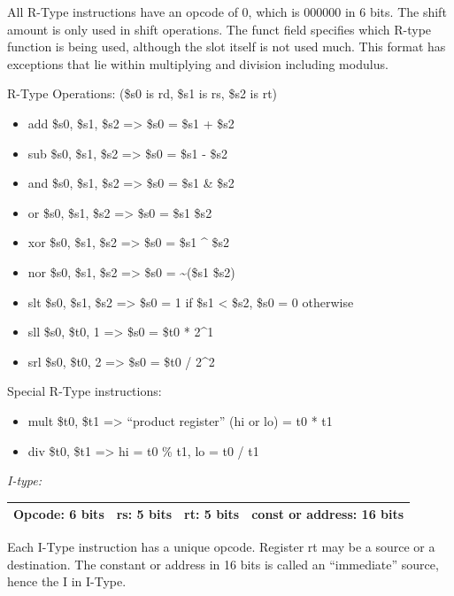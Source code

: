 \documentclass[parskip=half, fontsize=12pt]{scrartcl}
\providecommand{\tightlist}{%
  \setlength{\itemsep}{0pt}\setlength{\parskip}{0pt}}
\begin{document}
All R-Type instructions have an opcode of 0, which is 000000 in 6 bits.
The shift amount is only used in shift operations. The funct field
specifies which R-type function is being used, although the slot itself
is not used much. This format has exceptions that lie within multiplying
and division including modulus.

R-Type Operations: (\$s0 is rd, \$s1 is rs, \$s2 is rt)

\begin{itemize}
    \tightlist
    \item add \$s0, \$s1, \$s2 =\textgreater{} \$s0 = \$s1 + \$s2
    \item sub \$s0, \$s1, \$s2 =\textgreater{} \$s0 = \$s1 - \$s2
    \item and \$s0, \$s1, \$s2 =\textgreater{} \$s0 = \$s1 \& \$s2
    \item or \$s0, \$s1, \$s2 =\textgreater{} \$s0 = \$s1 \textbar{} \$s2
    \item xor \$s0, \$s1, \$s2 =\textgreater{} \$s0 = \$s1 \^{} \$s2
    \item nor \$s0, \$s1, \$s2 =\textgreater{} \$s0 = \textasciitilde(\$s1 \textbar{} \$s2)
    \item slt \$s0, \$s1, \$s2 =\textgreater{} \$s0 = 1 if \$s1 \textless{} \$s2, \$s0 = 0 otherwise
    \item sll \$s0, \$t0, 1 =\textgreater{} \$s0 = \$t0 * 2\^{}1 \item srl \$s0, \$t0, 2 =\textgreater{} \$s0 = \$t0 / 2\^{}2
\end{itemize}

Special R-Type instructions:

\begin{itemize}
    \tightlist
    \item mult \$t0, \$t1 =\textgreater{} ``product register'' (hi or lo) = t0 * t1
    \item div \$t0, \$t1 =\textgreater{} hi = t0 \% t1, lo = t0 / t1
\end{itemize}

\emph{I-type:}

\begin{tabularx}{\textwidth}{@{}|c|c|c|C|@{}}
    \hline
    Opcode: 6 bits & rs: 5 bits & rt: 5 bits & const or address: 16 bits \\
    \hline
\end{tabularx}

Each I-Type instruction has a unique opcode. Register rt may be a source
or a destination. The constant or address in 16 bits is called an
``immediate'' source, hence the I in I-Type.
\end{document}
